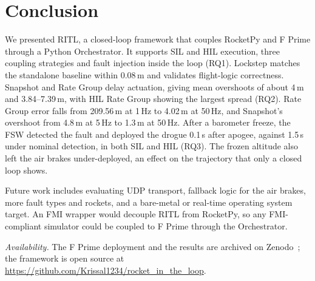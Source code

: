 \section{Conclusion}\label{s:conclusion}
We presented RITL, a closed-loop framework that couples RocketPy and F Prime through a Python Orchestrator. It supports SIL and HIL execution, three coupling strategies and fault injection inside the loop (RQ1). Lockstep matches the standalone baseline within 0.08\,m and validates flight-logic correctness. Snapshot and Rate Group delay actuation, giving mean overshoots of about 4\,m and 3.84--7.39\,m, with HIL Rate Group showing the largest spread (RQ2). Rate Group error falls from 209.56\,m at 1\,Hz to 4.02\,m at 50\,Hz, and Snapshot's overshoot from 4.8\,m at 5\,Hz to 1.3\,m at 50\,Hz. After a barometer freeze, the FSW detected the fault and deployed the drogue 0.1\,s after apogee, against 1.5\,s under nominal detection, in both SIL and HIL (RQ3). The frozen altitude also left the air brakes under-deployed, an effect on the trajectory that only a closed loop shows.

Future work includes evaluating UDP transport, fallback logic for the air brakes, more fault types and rockets, and a bare-metal or real-time operating system target. An FMI wrapper would decouple RITL from RocketPy, so any FMI-compliant simulator could be coupled to F Prime through the Orchestrator.

\emph{Availability.} The F Prime deployment and the results are archived on Zenodo~\cite{kris_saliba_2026_24056809}; the framework is open source at \url{https://github.com/Krissal1234/rocket_in_the_loop}.